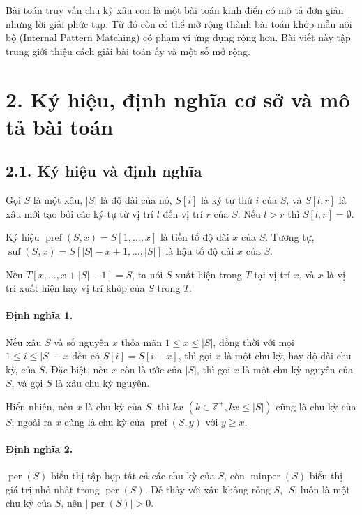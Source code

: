 \documentclass[11pt]{article}
\begin{document}
Bài toán truy vấn chu kỳ xâu con là một bài toán kinh điển có mô tả đơn giản
nhưng lời giải phức tạp. Từ đó còn có thể mở rộng thành bài toán khớp mẫu nội
bộ (Internal Pattern Matching) có phạm vi ứng dụng rộng hơn. Bài viết này tập
trung giới thiệu cách giải bài toán ấy và một số mở rộng.

\section*{2. Ký hiệu, định nghĩa cơ sở và mô tả bài toán}

\subsection*{2.1. Ký hiệu và định nghĩa}

Gọi \(S\) là một xâu, \(|S|\) là độ dài của nó, \(S[i]\) là ký tự thứ \(i\) của
\(S\), và \(S[l,r]\) là xâu mới tạo bởi các ký tự từ vị trí \(l\) đến vị trí
\(r\) của \(S\). Nếu \(l>r\) thì \(S[l,r]=\emptyset\).

Ký hiệu \(\operatorname{pref}(S,x)=S[1,\ldots,x]\) là tiền tố độ dài \(x\) của
\(S\). Tương tự, \(\operatorname{suf}(S,x)=S[|S|-x+1,\ldots,|S|]\) là hậu tố độ
dài \(x\) của \(S\).

Nếu \(T[x,\ldots,x+|S|-1]=S\), ta nói \(S\) xuất hiện trong \(T\) tại vị trí
\(x\), và \(x\) là vị trí xuất hiện hay vị trí khớp của \(S\) trong \(T\).

\paragraph{Định nghĩa 1.}
Nếu xâu \(S\) và số nguyên \(x\) thỏa mãn \(1\le x\le |S|\), đồng thời với mọi
\(1\le i\le |S|-x\) đều có \(S[i]=S[i+x]\), thì gọi \(x\) là một chu kỳ, hay độ
dài chu kỳ, của \(S\). Đặc biệt, nếu \(x\) còn là ước của \(|S|\), thì gọi
\(x\) là một chu kỳ nguyên của \(S\), và gọi \(S\) là xâu chu kỳ nguyên.

Hiển nhiên, nếu \(x\) là chu kỳ của \(S\), thì \(kx\)
\((k\in\mathbb Z^+, kx\le |S|)\) cũng là chu kỳ của \(S\); ngoài ra \(x\) cũng
là chu kỳ của \(\operatorname{pref}(S,y)\) với \(y\ge x\).

\paragraph{Định nghĩa 2.}
\(\operatorname{per}(S)\) biểu thị tập hợp tất cả các chu kỳ của \(S\), còn
\(\operatorname{minper}(S)\) biểu thị giá trị nhỏ nhất trong
\(\operatorname{per}(S)\). Dễ thấy với xâu không rỗng \(S\), \(|S|\) luôn là
một chu kỳ của \(S\), nên \(|\operatorname{per}(S)|>0\).
\end{document}
